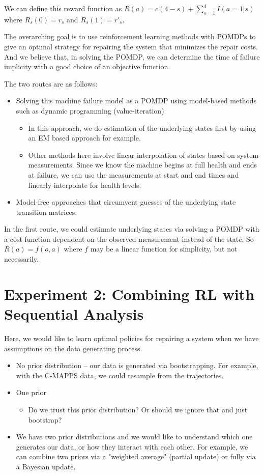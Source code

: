 \documentclass[english]{article}
\numberwithin{equation}{section}
\begin{document}
We can define this reward function as $R(a)=c(4-s) + \sum_{s=1}^4 I(a=1|s)$ where $R_s(0)=r_s$ and $R_s(1)=r'_s$.

The overarching goal is to use reinforcement learning methods with POMDPs to give an optimal strategy for repairing the system that minimizes the repair costs. And we believe that, in solving the POMDP, we can determine the time of failure implicity with a good choice of an objective function.

The two routes are as follows:
\begin{itemize}
	\item Solving this machine failure model as a POMDP using model-based methods such as dynamic programming (value-iteration)
	\begin{itemize}
		\item In this approach, we do estimation of the underlying states first by using an EM based approach for example.
		\item Other methods here involve linear interpolation of states based on system measurements. Since we know the machine begins at full health and ends at failure, we can use the measurements at start and end times and linearly interpolate for health levels.
	\end{itemize}
	\item Model-free approaches that circumvent guesses of the underlying state transition matrices.
\end{itemize}

In the first route, we could estimate underlying states via solving a POMDP with a cost function dependent on the observed measurement instead of the state. So $R(a)=f(o,a)$ where $f$ may be a linear function for simplicity, but not necessarily.

\section*{Experiment 2: Combining RL with Sequential Analysis}
Here, we would like to learn optimal policies for repairing a system when we have assumptions on the data generating process.
\begin{itemize}
	\item No prior distribution -- our data is generated via bootstrapping. For example, with the C-MAPPS data, we could resample from the trajectories.
	\item One prior
	\begin{itemize}
		\item Do we trust this prior distribution? Or should we ignore that and just bootstrap?
	\end{itemize}
	\item We have two prior distributions and we would like to understand which one generates our data, or how they interact with each other. For example, we can combine two priors via a "weighted average" (partial update) or fully via a Bayesian update.
\end{itemize}
\end{document}

